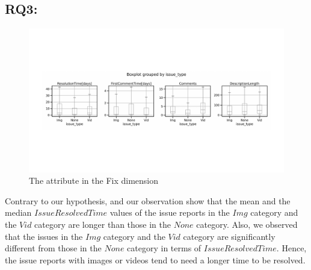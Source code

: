 \subsection*{RQ3: \RQthree{}}
\begin{figure}[t]
    \centering
    \includegraphics[width=0.5\linewidth]{./figures/fixes.pdf}
    \caption{The attribute in the Fix dimension}
    \label{fig:resolvedtime}
\end{figure}

Contrary to our hypothesis,  and our observation show that 
the mean and the median $IssueResolvedTime$ values of 
the issue reports in the $Img$ category and the $Vid$ category are 
longer than those in the $None$ category. 
Also, we observed that the issues in the $Img$ category and 
the $Vid$ category are significantly different from those 
in the $None$ category in terms of $IssueResolvedTime$.
Hence, the issue reports with images or videos tend to need 
a longer time to be resolved. 

